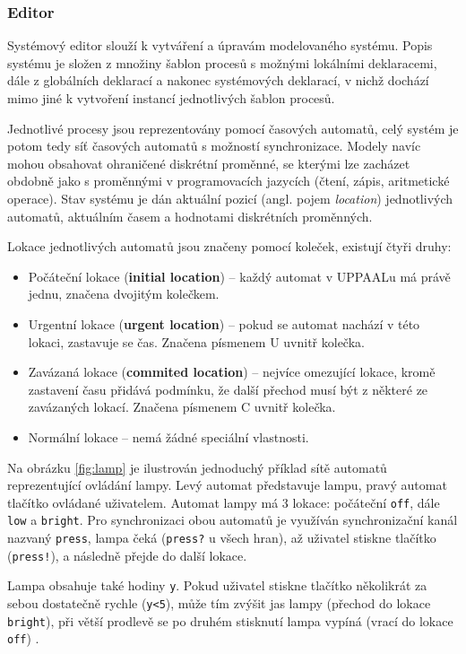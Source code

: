 \subsubsection{Editor}
Systémový editor slouží k vytváření a úpravám modelovaného systému. Popis systému je složen z množiny šablon procesů s možnými lokálními deklaracemi, dále z globálních deklarací a nakonec systémových deklarací, v nichž dochází mimo jiné k vytvoření instancí jednotlivých šablon procesů.

Jednotlivé procesy jsou reprezentovány pomocí časových automatů, celý systém je potom tedy síť časových automatů s možností synchronizace. Modely navíc mohou obsahovat ohraničené diskrétní proměnné, se kterými lze zacházet obdobně jako s proměnnými v programovacích jazycích (čtení, zápis, aritmetické operace). Stav systému je dán aktuální pozicí (angl. pojem \textit{location}) jednotlivých automatů, aktuálním časem a hodnotami diskrétních proměnných.

Lokace jednotlivých automatů jsou značeny pomocí koleček, existují čtyři druhy:
\begin{itemize}
    \item Počáteční lokace (\textbf{initial location}) -- každý automat v UPPAALu má právě jednu, značena dvojitým kolečkem.
    \item Urgentní lokace (\textbf{urgent location}) -- pokud se automat nachází v této lokaci, zastavuje se čas. Značena písmenem U uvnitř kolečka.
    \item Zavázaná lokace (\textbf{commited location}) -- nejvíce omezující lokace, kromě zastavení času přidává podmínku, že další přechod musí být z některé ze zavázaných lokací. Značena písmenem C uvnitř kolečka.
    \item Normální lokace -- nemá žádné speciální vlastnosti.
\end{itemize}

Na obrázku \ref{fig:lamp} je ilustrován jednoduchý příklad sítě automatů reprezentující ovládání lampy. Levý automat představuje lampu, pravý automat tlačítko ovládané uživatelem. Automat lampy má 3 lokace: počáteční \texttt{off}, dále \texttt{low} a \texttt{bright}. Pro synchronizaci obou automatů je využíván synchronizační kanál nazvaný \texttt{press}, lampa čeká (\texttt{press?} u všech hran), až uživatel stiskne tlačítko (\texttt{press!}), a následně přejde do další lokace.

Lampa obsahuje také hodiny \texttt{y}. Pokud uživatel stiskne tlačítko několikrát za sebou dostatečně rychle (\texttt{y<5}), může tím zvýšit jas lampy (přechod do lokace \texttt{bright}), při větší prodlevě se po druhém stisknutí lampa vypíná (vrací do lokace \texttt{off}) \cite{uppaal_intro}.

